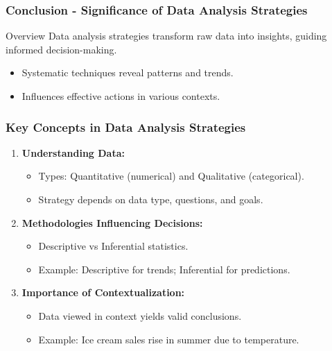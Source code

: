 \documentclass[aspectratio=169]{beamer}
\begin{document}
\begin{frame}[fragile]
    \frametitle{Conclusion - Significance of Data Analysis Strategies}
    \begin{block}{Overview}
        Data analysis strategies transform raw data into insights, guiding informed decision-making.
    \end{block}
    
    \begin{itemize}
        \item Systematic techniques reveal patterns and trends.
        \item Influences effective actions in various contexts.
    \end{itemize}
\end{frame}

\begin{frame}[fragile]
    \frametitle{Key Concepts in Data Analysis Strategies}
    \begin{enumerate}
        \item \textbf{Understanding Data:}
        \begin{itemize}
            \item Types: Quantitative (numerical) and Qualitative (categorical).
            \item Strategy depends on data type, questions, and goals.
        \end{itemize}
        
        \item \textbf{Methodologies Influencing Decisions:}
        \begin{itemize}
            \item Descriptive vs Inferential statistics.
            \item Example: Descriptive for trends; Inferential for predictions.
        \end{itemize}

        \item \textbf{Importance of Contextualization:}
        \begin{itemize}
            \item Data viewed in context yields valid conclusions.
            \item Example: Ice cream sales rise in summer due to temperature.
        \end{itemize}
    \end{enumerate}
\end{frame}
\end{document}
